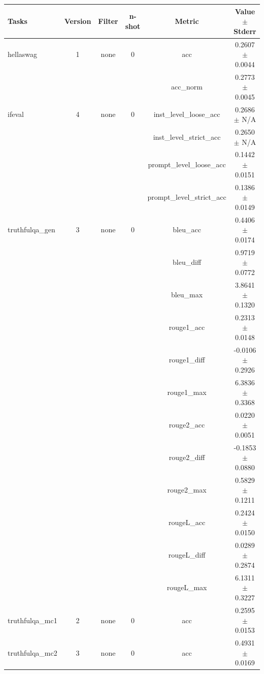 \documentclass{ifacconf}
\begin{document}
\begin{strip}
\begin{minipage}{\textwidth}
			\begin{table}[H]
				\centering
				\begin{tabular}{|l|c|c|c|c|c|}
					\hline
					\textbf{Tasks} & \textbf{Version} & \textbf{Filter} & \textbf{n-shot} & \textbf{Metric} & \textbf{Value} $\pm$ \textbf{Stderr} \\ \hline
					hellaswag & 1 & none & 0 & acc & 0.2607 $\pm$ 0.0044 \\ \hline
					& & & & acc\_norm & 0.2773 $\pm$ 0.0045 \\ \hline
					ifeval & 4 & none & 0 & inst\_level\_loose\_acc & 0.2686 $\pm$ N/A \\ \hline
					& & & & inst\_level\_strict\_acc & 0.2650 $\pm$ N/A \\ \hline
					& & & & prompt\_level\_loose\_acc & 0.1442 $\pm$ 0.0151 \\ \hline
					& & & & prompt\_level\_strict\_acc & 0.1386 $\pm$ 0.0149 \\ \hline
					truthfulqa\_gen & 3 & none & 0 & bleu\_acc & 0.4406 $\pm$ 0.0174 \\ \hline
					& & & & bleu\_diff & 0.9719 $\pm$ 0.0772 \\ \hline
					& & & & bleu\_max & 3.8641 $\pm$ 0.1320 \\ \hline
					& & & & rouge1\_acc & 0.2313 $\pm$ 0.0148 \\ \hline
					& & & & rouge1\_diff & -0.0106 $\pm$ 0.2926 \\ \hline
					& & & & rouge1\_max & 6.3836 $\pm$ 0.3368 \\ \hline
					& & & & rouge2\_acc & 0.0220 $\pm$ 0.0051 \\ \hline
					& & & & rouge2\_diff & -0.1853 $\pm$ 0.0880 \\ \hline
					& & & & rouge2\_max & 0.5829 $\pm$ 0.1211 \\ \hline
					& & & & rougeL\_acc & 0.2424 $\pm$ 0.0150 \\ \hline
					& & & & rougeL\_diff & 0.0289 $\pm$ 0.2874 \\ \hline
					& & & & rougeL\_max & 6.1311 $\pm$ 0.3227 \\ \hline
					truthfulqa\_mc1 & 2 & none & 0 & acc & 0.2595 $\pm$ 0.0153 \\ \hline
					truthfulqa\_mc2 & 3 & none & 0 & acc & 0.4931 $\pm$ 0.0169 \\ \hline
				\end{tabular}
				\label{tab:qwen25_q8}
			\end{table}
		\end{minipage}
	\end{strip}
	
\end{document}
